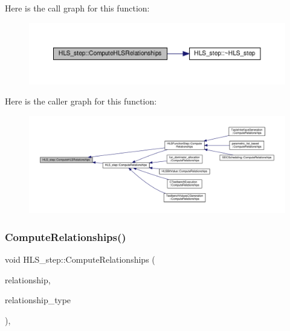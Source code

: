 Here is the call graph for this function\+:
\nopagebreak
\begin{figure}[H]
\begin{center}
\leavevmode
\includegraphics[width=350pt]{da/d27/classHLS__step_aed0ce8cca9a1ef18e705fc1032ad4de5_cgraph}
\end{center}
\end{figure}
Here is the caller graph for this function\+:
\nopagebreak
\begin{figure}[H]
\begin{center}
\leavevmode
\includegraphics[width=350pt]{da/d27/classHLS__step_aed0ce8cca9a1ef18e705fc1032ad4de5_icgraph}
\end{center}
\end{figure}
\mbox{\label{classHLS__step_ad5c58777d9b466fb3eee185f6d3ac993}} 
\subsubsection{\texorpdfstring{Compute\+Relationships()}{ComputeRelationships()}}
{\footnotesize\ttfamily void H\+L\+S\+\_\+step\+::\+Compute\+Relationships (\begin{DoxyParamCaption}\item[{\hyperlink{classDesignFlowStepSet}{Design\+Flow\+Step\+Set} \&}]{relationship,  }\item[{const \hyperlink{classDesignFlowStep_a723a3baf19ff2ceb77bc13e099d0b1b7}{Design\+Flow\+Step\+::\+Relationship\+Type}}]{relationship\+\_\+type }\end{DoxyParamCaption})\hspace{0.3cm}{\ttfamily [override]}, {\ttfamily [virtual]}}




